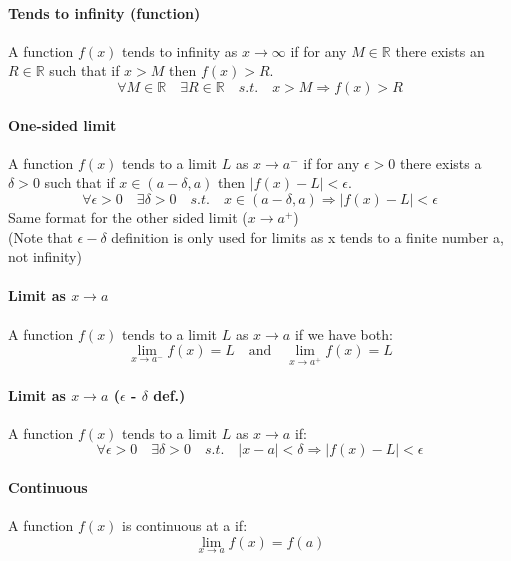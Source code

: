 \documentclass{article}
\newcommand{\R}{\mathbb{R}}
\begin{document}
\paragraph{Tends to infinity (function)}
A function $ f(x) $ tends to infinity as $ x \to \infty $ if for any $ M \in \R $ there exists an $ R \in \R $ such that if $ x > M $ then $ f(x) > R $.
\begin{equation}
\forall M \in \R \quad \exists R \in \R \quad s.t. \quad x > M \Rightarrow f(x) > R
\end{equation}
\paragraph{One-sided limit}
A function $ f(x) $ tends to a limit $ L $ as $ x \to a^{-} $ if for any $ \epsilon > 0 $ there exists a $ \delta > 0 $ such that if $ x \in (a - \delta, a) $ then $ |f(x) - L| < \epsilon $.
\begin{equation}
\forall \epsilon > 0 \quad \exists \delta > 0 \quad s.t. \quad x \in (a - \delta, a) \Rightarrow |f(x) - L| < \epsilon
\end{equation}
\noindent Same format for the other sided limit ($ x \to a^{+} $)
\\
(Note that $ \epsilon - \delta $ definition is only used for limits as x tends to a finite number a, not infinity)
\paragraph{Limit as $ x \to a $}
A function $ f(x) $ tends to a limit $ L $ as $ x \to a $ if we have both:
\begin{equation}
\lim_{x \to a^{-}}f(x) = L \quad \textrm{and} \quad \lim_{x \to a^{+}}f(x) = L
\end{equation}
\paragraph{Limit as $ x \to a $ ($ \epsilon $ - $ \delta $ def.)}
A function $ f(x) $ tends to a limit $ L $ as $ x \to a $ if:
\begin{equation}
\forall \epsilon > 0 \quad \exists \delta > 0 \quad s.t. \quad |x - a| < \delta \Rightarrow |f(x) - L| < \epsilon
\end{equation}
\paragraph{Continuous}
A function $ f(x) $ is continuous at a if:
\begin{equation}
\lim_{x \to a}f(x) = f(a)
\end{equation}
\end{document}
